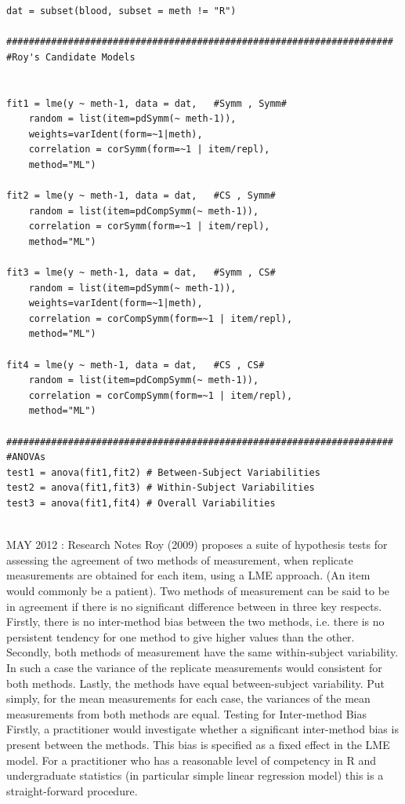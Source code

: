\documentclass[12pt, a4paper]{report}
\theoremstyle{plain}
\theoremstyle{definition}
\theoremstyle{remark}
\begin{document}
\begin{framed}
\begin{verbatim}
dat = subset(blood, subset = meth != "R")

#####################################################################
#Roy's Candidate Models

    
fit1 = lme(y ~ meth-1, data = dat,   #Symm , Symm#
    random = list(item=pdSymm(~ meth-1)), 
    weights=varIdent(form=~1|meth),
    correlation = corSymm(form=~1 | item/repl), 
    method="ML")
    
fit2 = lme(y ~ meth-1, data = dat,   #CS , Symm#
    random = list(item=pdCompSymm(~ meth-1)),
    correlation = corSymm(form=~1 | item/repl), 
    method="ML")
    
fit3 = lme(y ~ meth-1, data = dat,   #Symm , CS# 
    random = list(item=pdSymm(~ meth-1)),
    weights=varIdent(form=~1|meth), 
    correlation = corCompSymm(form=~1 | item/repl), 
    method="ML")
    
fit4 = lme(y ~ meth-1, data = dat,   #CS , CS# 
    random = list(item=pdCompSymm(~ meth-1)), 
    correlation = corCompSymm(form=~1 | item/repl), 
    method="ML")
    
#####################################################################
#ANOVAs
test1 = anova(fit1,fit2) # Between-Subject Variabilities
test2 = anova(fit1,fit3) # Within-Subject Variabilities
test3 = anova(fit1,fit4) # Overall Variabilities


\end{verbatim}
\end{framed}
MAY 2012 : Research Notes
Roy (2009) proposes a suite of hypothesis tests for assessing the agreement of two methods of measurement, when replicate measurements are obtained for each item, using a LME approach. (An item would commonly be a patient).  Two methods of measurement can be said to be in agreement if there is no significant difference between in three key respects. Firstly, there is no inter-method bias between the two methods, i.e. there is no persistent tendency for one method to give higher values than the other.
Secondly, both methods of measurement have the same  within-subject variability. In such a case the variance of the replicate measurements would consistent for both methods.
Lastly, the methods have equal between-subject variability.  Put simply, for the mean measurements for each case, the variances of the mean measurements from both methods are equal.
Testing for Inter-method Bias
Firstly, a practitioner would investigate whether a significant inter-method bias is present between the methods. This bias is specified as a fixed effect in the LME model.  For a practitioner who has a reasonable level of competency in R and undergraduate statistics (in particular simple linear regression model) this is a straight-forward procedure.
\end{document}
